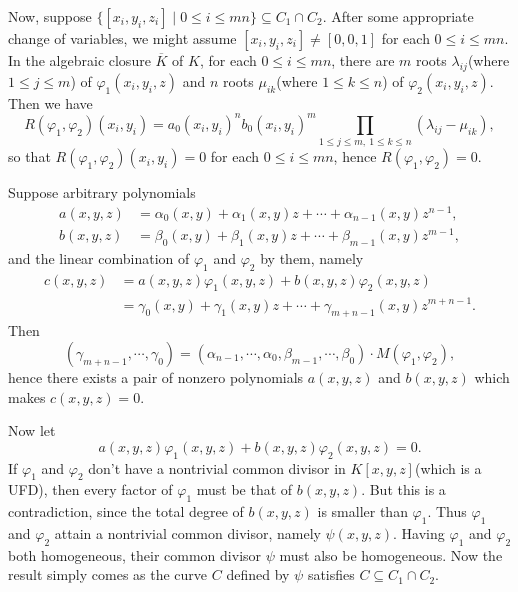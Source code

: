 \documentclass{article}
\begin{document}
Now, suppose $\{[x_i, y_i, z_i] \mid 0 \le i \le mn \} \subseteq C_1 \cap C_2$. After some appropriate change of variables, we might assume $[x_i, y_i, z_i] \ne [0,0,1]$ for each $0 \le i \le mn$. In the algebraic closure $\overline{K}$ of $K$, for each $0 \le i \le mn$, there are $m$ roots $\lambda_{ij}$(where $1 \le j \le m$) of $\varphi_1(x_i, y_i, z)$ and $n$ roots $\mu_{ik}$(where $1 \le k \le n$) of $\varphi_2(x_i, y_i, z)$. Then we have
$$
R(\varphi_1, \varphi_2)(x_i, y_i) = a_0(x_i, y_i)^n b_0(x_i, y_i)^m \prod_{1 \le j \le m,\ 1 \le k \le n} (\lambda_{ij} - \mu_{ik}),
$$
so that $R(\varphi_1, \varphi_2)(x_i, y_i) = 0$ for each $0 \le i \le mn$, hence $R(\varphi_1, \varphi_2) = 0$.

Suppose arbitrary polynomials
$$
\begin{align*}
a(x,y,z) &= \alpha_0(x,y) + \alpha_1(x,y) z + \cdots + \alpha_{n-1}(x,y)z^{n-1}, \\
b(x,y,z) &= \beta_0(x,y) + \beta_1(x,y) z + \cdots + \beta_{m-1}(x,y)z^{m-1},
\end{align*}
$$
and the linear combination of $\varphi_1$ and $\varphi_2$ by them, namely
$$
\begin{align*}
c(x,y,z) &= a(x,y,z)\varphi_1(x,y,z) + b(x,y,z)\varphi_2(x,y,z) \\
&= \gamma_0(x,y) + \gamma_1(x,y)z + \cdots + \gamma_{m+n-1}(x,y)z^{m+n-1}.
\end{align*}
$$
Then
$$
(\gamma_{m+n-1}, \cdots, \gamma_0) = (\alpha_{n-1}, \cdots, \alpha_0, \beta_{m-1}, \cdots, \beta_0) \cdot M(\varphi_1, \varphi_2),
$$
hence there exists a pair of nonzero polynomials $a(x,y,z)$ and $b(x,y,z)$ which makes $c(x,y,z) = 0$.

Now let
$$
a(x,y,z)\varphi_1(x,y,z) + b(x,y,z)\varphi_2(x,y,z) = 0.
$$
If $\varphi_1$ and $\varphi_2$ don't have a nontrivial common divisor in $K[x,y,z]$(which is a UFD), then every factor of $\varphi_1$ must be that of $b(x,y,z)$. But this is a contradiction, since the total degree of $b(x,y,z)$ is smaller than $\varphi_1$. Thus $\varphi_1$ and $\varphi_2$ attain a nontrivial common divisor, namely $\psi(x,y,z)$. Having $\varphi_1$ and $\varphi_2$ both homogeneous, their common divisor $\psi$ must also be homogeneous. Now the result simply comes as the curve $C$ defined by $\psi$ satisfies $C \subseteq C_1 \cap C_2$.
\end{document}
